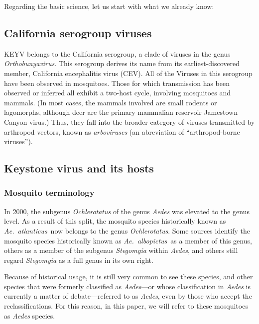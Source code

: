 \documentclass[12pt]{article}
\newcommand{\alb}{\textit{Ae.\ albopictus}}
\newcommand{\atl}{\textit{Ae.\ atlanticus}}
\begin{document}
        Regarding the basic science, let us start with what we already know:

        \subsection{California serogroup viruses}
            \label{california-serogroup}
            KEYV belongs to the California serogroup, a clade of viruses in the genus \textit{Orthobunyavirus}. This serogroup derives its name from its earliest-discovered member, California encephalitis virus (CEV). All of the Viruses in this serogroup have been observed in mosquitoes. Those for which transmission has been observed or inferred all exhibit a two-host cycle, involving mosquitoes and mammals. (In most cases, the mammals involved are small rodents or lagomorphs, although deer are the primary mammalian reservoir Jamestown Canyon virus.) Thus, they fall into the broader category of viruses transmitted by arthropod vectors, known as \textit{arboviruses} (an abreviation of ``arthropod-borne viruses'').
        
        \subsection{Keystone virus and its hosts}
            \label{california-keystone}
            \subsubsection{Mosquito terminology}
                \label{mosquito-terminology}
                In 2000, the subgenus \textit{Ochlerotatus} of the genus \textit{Aedes} was elevated to the genus level. As a result of this split, the mosquito species historically known as \atl\ now belongs to the genus \textit{Ochlerotatus}\cite{reinert2000new}. Some sources identify the mosquito species historically known as \alb\ as a member of this genus, others as a member of the subgenus \textit{Stegomyia} within \textit{Aedes}, and others still regard \textit{Stegomyia} as a full genus in its own right.
                
                Because of historical usage, it is still very common to see these species, and other species that were formerly classified as \textit{Aedes}---or whose classification in \textit{Aedes} is currently a matter of debate---referred to as \textit{Aedes}, even by those who accept the reclassifications. For this reason, in this paper, we will refer to these mosquitoes as \textit{Aedes} species.
\end{document}
